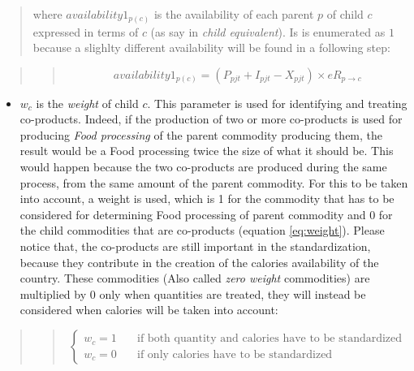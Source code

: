 \documentclass[]{article}
\providecommand{\tightlist}{%
  \setlength{\itemsep}{0pt}\setlength{\parskip}{0pt}}
\begin{document}
\begin{quote}
where \(availability1_{p(c)}\) is the availability of each parent \(p\)
of child \(c\) expressed in terms of \(c\) (as say in \emph{child
equivalent}). Is is enumerated as \(1\) because a slighlty different
availability will be found in a following step:
\end{quote}

\begin{quote}
\begin{quote}
\begin{equation}
\label{eq:availability 1}
availability1_{p(c)} = (P_{pjt} + I_{pjt} - X_{pjt})\times eR_{p\to c}
\end{equation}
\end{quote}
\end{quote}

\begin{itemize}
\tightlist
\item
  \(w_{c}\) is the \emph{weight} of child \(c\). This parameter is used
  for identifying and treating co-products. Indeed, if the production of
  two or more co-products is used for producing \emph{Food processing}
  of the parent commodity producing them, the result would be a Food
  processing twice the size of what it should be. This would happen
  because the two co-products are produced during the same process, from
  the same amount of the parent commodity. For this to be taken into
  account, a weight is used, which is 1 for the commodity that has to be
  considered for determining Food processing of parent commodity and 0
  for the child commodities that are co-products (equation
  \ref{eq:weight}). Please notice that, the co-products are still
  important in the standardization, because they contribute in the
  creation of the calories availability of the country. These
  commodities (Also called \emph{zero weight} commodities) are
  multiplied by 0 only when quantities are treated, they will instead be
  considered when calories will be taken into account:
\end{itemize}

\begin{quote}
\begin{quote}
\begin{equation}
\label{eq:weight}
\begin{cases}
w_{c} = 1      & \quad \text{if both quantity and calories have to be standardized} \\
w_{c} = 0      & \quad \text{if only calories have to be standardized}
\end{cases}
\end{equation}
\end{quote}
\end{quote}
\end{document}
